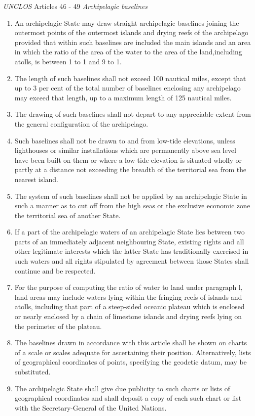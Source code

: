 \begin{conventiondetails}{\textit{UNCLOS} Articles 46 - 49}
    \textit{Archipelagic baselines}
    \begin{enumerate}
        \item An archipelagic State may draw straight archipelagic baselines joining the outermost points of the outermost islands and drying reefs of the archipelago provided that within such baselines are included the main islands and an area in which the ratio of the area of the water to the area of the land,including atolls, is between 1 to 1 and 9 to 1.
        \item The length of such baselines shall not exceed 100 nautical miles, except that up to 3 per cent of the total number of baselines enclosing any archipelago may exceed that length, up to a maximum length of 125 nautical miles.
        \item The drawing of such baselines shall not depart to any appreciable extent from the general configuration of the archipelago.
        \item Such baselines shall not be drawn to and from low-tide elevations, unless lighthouses or similar installations which are permanently above sea level have been built on them or where a low-tide elevation is situated wholly or partly at a distance not exceeding the breadth of the territorial sea from the nearest island.
        \item The system of such baselines shall not be applied by an archipelagic State in such a manner as to cut off from the high seas or the exclusive economic zone the territorial sea of another State.
        \item If a part of the archipelagic waters of an archipelagic State lies between two parts of an immediately adjacent neighbouring State, existing rights and all other legitimate interests which the latter State has traditionally exercised in such waters and all rights stipulated by agreement between those States shall continue and be respected.
        \item For the purpose of computing the ratio of water to land under paragraph l, land areas may include waters lying within the fringing reefs of islands and atolls, including that part of a steep-sided oceanic plateau which is enclosed or nearly enclosed by a chain of limestone islands and drying reefs lying on the perimeter of the plateau.
        \item The baselines drawn in accordance with this article shall be shown on charts of a scale or scales adequate for ascertaining their position. Alternatively, lists of geographical coordinates of points, specifying the geodetic datum, may be substituted.
        \item The archipelagic State shall give due publicity to such charts or lists of geographical coordinates and shall deposit a copy of each such chart or list with the Secretary-General of the United Nations.
    \end{enumerate}


\end{conventiondetails}
